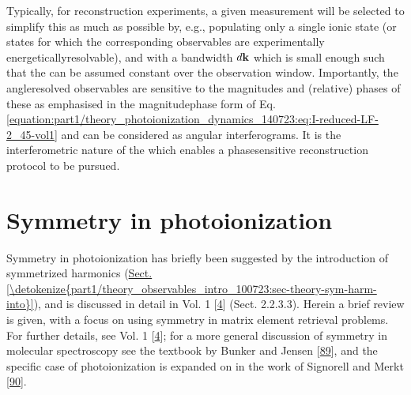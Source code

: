 \documentclass[letterpaper,table,10pt,english]{jupyterBook}
\begin{document}
\sphinxAtStartPar
Typically, for reconstruction experiments, a given measurement will be
selected to simplify this as much as possible by, e.g., populating only
a single ionic state (or states for which the corresponding observables
are experimentally energetically\sphinxhyphen{}resolvable), and with a bandwidth
\(d\bf{k}\) which is small enough such that the {\hyperref[\detokenize{backmatter/glossary:term-radial-matrix-elements}]{}} can be
assumed constant over the observation window. Importantly, the angle\sphinxhyphen{}resolved observables are
sensitive to the magnitudes and (relative) phases of these {\hyperref[\detokenize{backmatter/glossary:term-radial-matrix-elements}]{}} \sphinxhyphen{} as emphasised in the magnitude\sphinxhyphen{}phase form of Eq. \eqref{equation:part1/theory_photoionization_dynamics_140723:eq:I-reduced-LF-2_45-vol1} \sphinxhyphen{} and can be considered as angular interferograms. It is the interferometric nature of the {\hyperref[\detokenize{backmatter/glossary:term-PADs}]{}} which enables a phase\sphinxhyphen{}sensitive reconstruction protocol to be pursued.

\sphinxstepscope


\section{Symmetry in photoionization}
\label{\detokenize{part1/theory_symmetry_140723:symmetry-in-photoionization}}\label{\detokenize{part1/theory_symmetry_140723:sec-theory-symmetry-intro}}\label{\detokenize{part1/theory_symmetry_140723::doc}}
\sphinxAtStartPar
Symmetry in photoionization has briefly been suggested by the introduction of symmetrized harmonics (\hyperref[\detokenize{part1/theory_observables_intro_100723:sec-theory-sym-harm-into}]{Sect.\@ \ref{\detokenize{part1/theory_observables_intro_100723:sec-theory-sym-harm-into}}}), and is discussed in detail in  Vol. 1 {[}\hyperlink{cite.backmatter/bibliography:id676}{4}{]} (Sect. 2.2.3.3). Herein a brief review is given, with a focus on using symmetry in matrix element retrieval problems. For further details, see  Vol. 1 {[}\hyperlink{cite.backmatter/bibliography:id676}{4}{]}; for a more general discussion of symmetry in molecular spectroscopy see the textbook by  Bunker and Jensen {[}\hyperlink{cite.backmatter/bibliography:id547}{89}{]}, and the specific case of photoionization is expanded on in the work of Signorell and Merkt {[}\hyperlink{cite.backmatter/bibliography:id887}{90}{]}.
\end{document}
